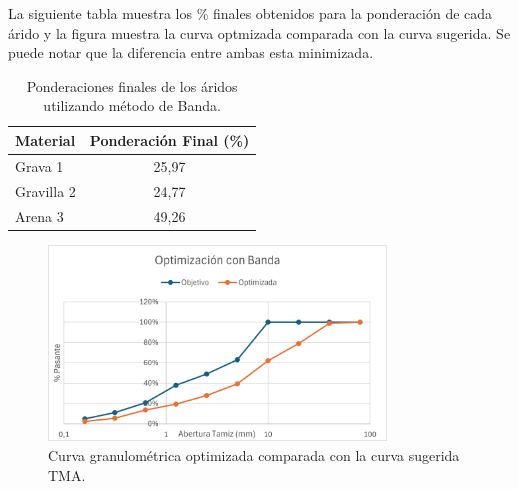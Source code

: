 La siguiente tabla muestra los \% finales obtenidos para la ponderación de cada árido y la figura muestra la curva optmizada comparada con la curva sugerida. Se puede notar que la diferencia entre ambas esta minimizada.

\begin{table}[H]
\centering
\caption{Ponderaciones finales de los áridos utilizando método de Banda.}
\begin{tabular}{|l|c|}
\hline
\textbf{Material} & \textbf{Ponderación Final (\%)} \\ \hline
Grava 1     & 25,97 \\ \hline
Gravilla 2  & 24,77 \\ \hline
Arena 3     & 49,26 \\ \hline
\end{tabular}
\end{table}

\begin{figure}[H]
    \centering
    \includegraphics[width=0.8\textwidth]{GRAFICOS/opti_banda.png}
    \caption{Curva granulométrica optimizada comparada con la curva sugerida TMA.}
\end{figure}

